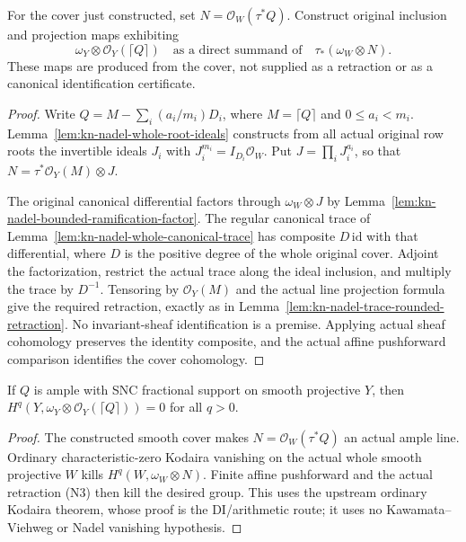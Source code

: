 \begin{lemma}
\label{lem:kn-nadel-smooth-cover-rounded-summand}
\notready
For the cover just constructed, set
$N=\mathcal O_W(\tau^*Q)$.  Construct original inclusion and projection
maps exhibiting
\[
 \omega_Y\otimes\mathcal O_Y(\lceil Q\rceil)
 \quad\text{as a direct summand of}\quad
 \tau_*(\omega_W\otimes N).
 \tag{N3}
\]
These maps are produced from the cover, not supplied as a retraction
or as a canonical identification certificate.
\end{lemma}
\begin{proof}
Write $Q=M-\sum_i(a_i/m_i)D_i$, where $M=\lceil Q\rceil$ and
$0\leq a_i<m_i$.  Lemma~\ref{lem:kn-nadel-whole-root-ideals} constructs
from all actual original row roots the invertible ideals $J_i$ with
$J_i^{m_i}=I_{D_i}\mathcal O_W$.  Put $J=\prod_iJ_i^{a_i}$, so that
$N=\tau^*\mathcal O_Y(M)\otimes J$.

The original canonical differential factors through $\omega_W\otimes J$
by Lemma~\ref{lem:kn-nadel-bounded-ramification-factor}.  The regular
canonical trace of Lemma~\ref{lem:kn-nadel-whole-canonical-trace} has
composite $D\,\mathrm{id}$ with that differential, where $D$ is the
positive degree of the whole original cover.  Adjoint the factorization,
restrict the actual trace along the ideal inclusion, and multiply the
trace by $D^{-1}$.  Tensoring by $\mathcal O_Y(M)$ and the actual line
projection formula give the required retraction, exactly as in
Lemma~\ref{lem:kn-nadel-trace-rounded-retraction}.  No invariant-sheaf
identification is a premise.  Applying actual sheaf cohomology preserves
the identity composite, and the actual affine pushforward comparison
identifies the cover cohomology.
\end{proof}

\begin{lemma}
\label{lem:kn-nadel-ample-q-vanishing}
\notready
If $Q$ is ample with SNC fractional support on smooth projective
$Y$, then $H^q(Y,\omega_Y\otimes\mathcal O_Y(\lceil Q\rceil))=0$
for all $q>0$.
\end{lemma}
\begin{proof}
The constructed smooth cover makes $N=\mathcal O_W(\tau^*Q)$ an
actual ample line.  Ordinary characteristic-zero Kodaira vanishing
on the actual whole smooth projective $W$ kills
$H^q(W,\omega_W\otimes N)$.  Finite affine pushforward and the
actual retraction (N3) then kill the desired group.  This uses the
upstream ordinary Kodaira theorem, whose proof is the DI/arithmetic
route; it uses no Kawamata--Viehweg or Nadel vanishing hypothesis.
\end{proof}

